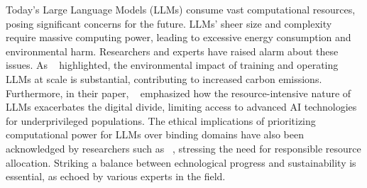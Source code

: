 Today's Large Language Models (LLMs) consume vast computational resources, posing significant concerns for the future.
LLMs' sheer size and complexity require massive computing power, leading to excessive energy consumption and environmental harm.
Researchers and experts have raised alarm about these issues.
As ~\cite{bender2021dangers} highlighted, the environmental impact of training and operating LLMs at scale is substantial, contributing to increased carbon emissions.
Furthermore, in their paper, \citeauthor{strubell2019energy}~\cite{strubell2019energy} emphasized how the resource-intensive nature of LLMs exacerbates the digital divide,
limiting access to advanced AI technologies for underprivileged populations. The ethical implications of prioritizing computational power for LLMs over binding
domains have also been acknowledged by researchers such as \citeauthor{amodei2016concrete}~\cite{amodei2016concrete}, stressing the need for responsible resource allocation. Striking a balance between
echnological progress and sustainability is essential, as echoed by various experts in the field.